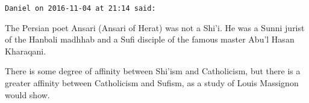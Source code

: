 \begin{footnotesize}
\begin{sffamily}
\hfill

\texttt{Daniel on 2016-11-04 at 21:14 said:}

The Persian poet Ansari (Ansari of Herat) was not a Shi'i. He was a Sunni jurist of the Hanbali madhhab and a Sufi disciple of the famous master Abu'l Hasan Kharaqani.

There is some degree of affinity between Shi'ism and Catholicism, but there is a greater affinity between Catholicism and Sufism, as a study of Louis Massignon would show.


\hfill

\end{sffamily}
\end{footnotesize}

